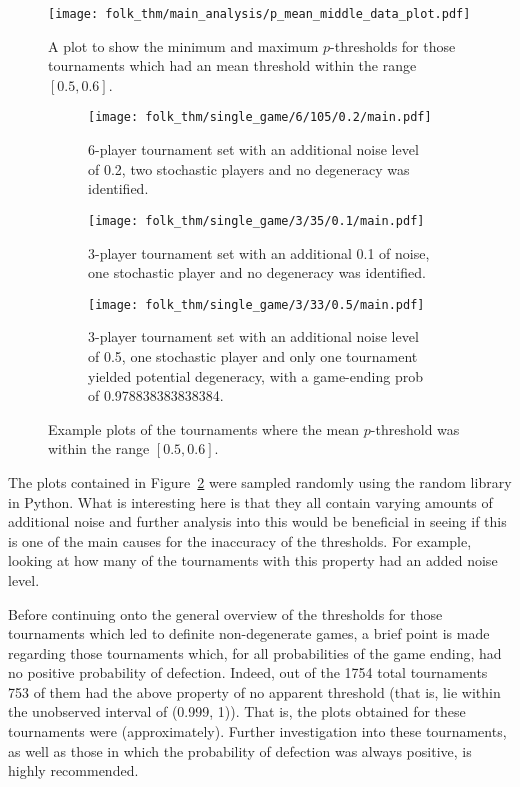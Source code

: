 \begin{figure}
    \centering
    \texttt{[image: folk\_thm/main\_analysis/p\_mean\_middle\_data\_plot.pdf]}
    \caption{A plot to show the minimum and maximum \(p\)-thresholds for those tournaments which had an mean threshold within the range \([0.5, 0.6]\).}\label{fig:p_mean_middle_plot}
\end{figure}


\begin{figure}
    \begin{subfigure}{0.3\textwidth}
        \centering
        \texttt{[image: folk\_thm/single\_game/6/105/0.2/main.pdf]}
        \caption{6-player tournament set with an additional noise level of 0.2, two stochastic players and no degeneracy was identified.}
    \end{subfigure}
    \begin{subfigure}{0.3\textwidth}
        \centering
        \texttt{[image: folk\_thm/single\_game/3/35/0.1/main.pdf]}
        \caption{3-player tournament set with an additional 0.1 of noise, one stochastic player and no degeneracy was identified.}
    \end{subfigure}
    \begin{subfigure}{0.3\textwidth}
        \centering
        \texttt{[image: folk\_thm/single\_game/3/33/0.5/main.pdf]}
        \caption{3-player tournament set with an additional noise level of 0.5, one stochastic player and only one tournament yielded potential degeneracy, with a game-ending prob of 0.978838383838384.}
    \end{subfigure}
    \caption{Example plots of the tournaments where the mean \(p\)-threshold was within the range \([0.5, 0.6]\).}\label{fig:mean_middle_specific}
\end{figure}

The plots contained in Figure~\ref{fig:mean_middle_specific} were sampled
randomly using the random library in Python. What is interesting here is that
they all contain varying amounts of additional noise and further analysis into
this would be beneficial in seeing if this is one of the main causes for the
inaccuracy of the thresholds. For example, looking at how many of the
tournaments with this property had an added noise level.

Before continuing onto the general overview of the thresholds for those
tournaments which led to definite non-degenerate games, a brief point is made
regarding those tournaments which, for all probabilities of the game ending, had
no positive probability of defection. Indeed, out of the 1754 total tournaments
753 of them had the above property of no apparent threshold (that is, lie within
the unobserved interval of (0.999, 1)). That is, the plots obtained
for these tournaments were (approximately). Further investigation into these
tournaments, as well as those in which the probability of
defection was always positive, is highly recommended. 

